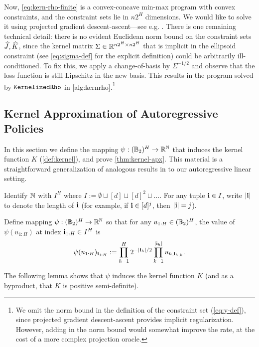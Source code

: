 Now, \cref{eq:kern-rho-finite} is a convex-concave min-max program with convex constraints, and the constraint sets lie in $n2^H$ dimensions. We would like to solve it using projected gradient descent-ascent---see e.g. \cite[Theorem 5.1]{bubeck2015convex}. There is one remaining technical detail: there is no evident Euclidean norm bound on the constraint sets $\widehat{J}, \widehat{K}$, since the kernel matrix $\Sigma \in \mathbb{R}^{n2^H \times n2^H}$ that is implicit in the ellipsoid constraint (see \cref{eq:sigma-def} for the explicit definition) could be arbitrarily ill-conditioned. To fix this, we apply a change-of-basis by $\Sigma^{-1/2}$ and observe that the loss function is still Lipschitz in the new basis. This results in the program solved by $\texttt{KernelizedRho}$ in \cref{alg:kernrho}.\footnote{We omit the norm bound in the definition of the constraint set (\cref{eq:y-def}), since projected gradient descent-ascent provides implicit regularization. However, adding in the norm bound would somewhat improve the rate, at the cost of a more complex projection oracle.}




\subsection{Kernel Approximation of Autoregressive Policies}\label{subsec:kernel-apx}

In this section we define the mapping $\psi: (\mathbb{B}_2)^H \to \mathbb{R}^{\mathbb{N}}$ that induces the kernel function $K$ (\cref{def:kernel}), and prove \cref{thm:kernel-apx}. This material is a straightforward generalization of analogous results in \cite{shalev2011learning} to our autoregressive linear setting.



\begin{definition}\label{def:psi}
Identify $\mathbb{N}$ with $I^H$ where $I := \emptyset\sqcup[d]\sqcup[d]^2 \sqcup\dots$. For any tuple $\mathbf{i} \in I$, write $|\mathbf{i}|$ to denote the length of $\mathbf{i}$ (for example, if $\mathbf{i}\in [d]^{j}$, then $\left\lvert\mathbf{i}\right\rvert=j$). 

Define mapping $\psi: (\mathbb{B}_2)^H \to \mathbb{R}^{\mathbb{N}}$ so that for any $u_{1:H} \in (\mathbb{B}_2)^H$, the value of $\psi(u_{1:H})$ at index $\mathbf{i}_{1:H} \in I^H$ is 
\[\psi(u_{1:H})_{\mathbf{i}_{1:H}} := \prod_{h=1}^H 2^{-|\mathbf{i}_h|/2} \prod_{k=1}^{|\mathbf{i}_h|} u_{h,\mathbf{i}_{h,k}}.\]
\end{definition}

The following lemma shows that $\psi$ induces the kernel function $K$ (and as a byproduct, that $K$ is positive semi-definite).

